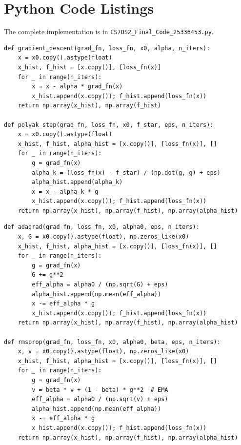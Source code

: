 \documentclass[11pt,a4paper]{article}
\theoremstyle{definition}
\begin{document}
\newpage
\appendix
\section{Python Code Listings}
\label{app:code}

The complete implementation is in \texttt{CS7DS2\_Final\_Code\_25336453.py}.

\begin{lstlisting}[caption={Core Gradient Methods}]
def gradient_descent(grad_fn, loss_fn, x0, alpha, n_iters):
    x = x0.copy().astype(float)
    x_hist, f_hist = [x.copy()], [loss_fn(x)]
    for _ in range(n_iters):
        x = x - alpha * grad_fn(x)
        x_hist.append(x.copy()); f_hist.append(loss_fn(x))
    return np.array(x_hist), np.array(f_hist)

def polyak_step(grad_fn, loss_fn, x0, f_star, eps, n_iters):
    x = x0.copy().astype(float)
    x_hist, f_hist, alpha_hist = [x.copy()], [loss_fn(x)], []
    for _ in range(n_iters):
        g = grad_fn(x)
        alpha_k = (loss_fn(x) - f_star) / (np.dot(g, g) + eps)
        alpha_hist.append(alpha_k)
        x = x - alpha_k * g
        x_hist.append(x.copy()); f_hist.append(loss_fn(x))
    return np.array(x_hist), np.array(f_hist), np.array(alpha_hist)
\end{lstlisting}

\begin{lstlisting}[caption={Adaptive Methods: Adagrad and RMSprop}]
def adagrad(grad_fn, loss_fn, x0, alpha0, eps, n_iters):
    x, G = x0.copy().astype(float), np.zeros_like(x0)
    x_hist, f_hist, alpha_hist = [x.copy()], [loss_fn(x)], []
    for _ in range(n_iters):
        g = grad_fn(x)
        G += g**2
        eff_alpha = alpha0 / (np.sqrt(G) + eps)
        alpha_hist.append(np.mean(eff_alpha))
        x -= eff_alpha * g
        x_hist.append(x.copy()); f_hist.append(loss_fn(x))
    return np.array(x_hist), np.array(f_hist), np.array(alpha_hist)

def rmsprop(grad_fn, loss_fn, x0, alpha0, beta, eps, n_iters):
    x, v = x0.copy().astype(float), np.zeros_like(x0)
    x_hist, f_hist, alpha_hist = [x.copy()], [loss_fn(x)], []
    for _ in range(n_iters):
        g = grad_fn(x)
        v = beta * v + (1 - beta) * g**2  # EMA
        eff_alpha = alpha0 / (np.sqrt(v) + eps)
        alpha_hist.append(np.mean(eff_alpha))
        x -= eff_alpha * g
        x_hist.append(x.copy()); f_hist.append(loss_fn(x))
    return np.array(x_hist), np.array(f_hist), np.array(alpha_hist)
\end{lstlisting}
\end{document}

